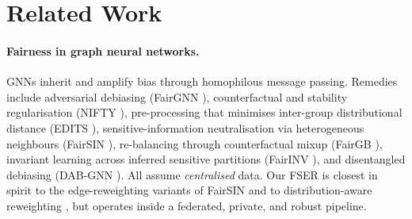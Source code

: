 \section{Related Work}
\label{sec:related}

\paragraph{Fairness in graph neural networks.}
GNNs inherit and amplify bias through homophilous message passing. Remedies
include adversarial debiasing (FairGNN \cite{dai2021say}), counterfactual and
stability regularisation (NIFTY \cite{agarwal2021nifty}), pre-processing that
minimises inter-group distributional distance (EDITS \cite{dong2022edits}),
sensitive-information neutralisation via heterogeneous neighbours (FairSIN
\cite{yang2024fairsin}), re-balancing through counterfactual mixup (FairGB
\cite{li2024fairgb}), invariant learning across inferred sensitive partitions
(FairINV \cite{zhu2024fairinv}), and disentangled debiasing (DAB-GNN
\cite{lee2025dabgnn}). All assume \emph{centralised} data. Our FSER is closest
in spirit to the edge-reweighting variants of FairSIN and to distribution-aware
reweighting \cite{fnrgnn2025}, but operates inside a federated, private, and
robust pipeline.

